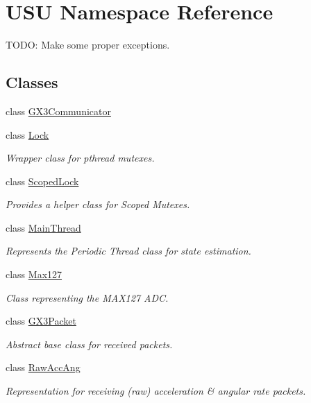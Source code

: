 \hypertarget{namespace_u_s_u}{\section{\-U\-S\-U \-Namespace \-Reference}
\label{namespace_u_s_u}
}


\-T\-O\-D\-O\-: \-Make some proper exceptions.  


\subsection*{\-Classes}
\begin{DoxyCompactItemize}
\item 
class \hyperlink{class_u_s_u_1_1_g_x3_communicator}{\-G\-X3\-Communicator}
\item 
class \hyperlink{class_u_s_u_1_1_lock}{\-Lock}
\begin{DoxyCompactList}\small\item\em \-Wrapper class for pthread mutexes. \end{DoxyCompactList}\item 
class \hyperlink{class_u_s_u_1_1_scoped_lock}{\-Scoped\-Lock}
\begin{DoxyCompactList}\small\item\em \-Provides a helper class for \-Scoped \-Mutexes. \end{DoxyCompactList}\item 
class \hyperlink{class_u_s_u_1_1_main_thread}{\-Main\-Thread}
\begin{DoxyCompactList}\small\item\em \-Represents the \-Periodic \-Thread class for state estimation. \end{DoxyCompactList}\item 
class \hyperlink{class_u_s_u_1_1_max127}{\-Max127}
\begin{DoxyCompactList}\small\item\em \-Class representing the \-M\-A\-X127 \-A\-D\-C. \end{DoxyCompactList}\item 
class \hyperlink{class_u_s_u_1_1_g_x3_packet}{\-G\-X3\-Packet}
\begin{DoxyCompactList}\small\item\em \-Abstract base class for received packets. \end{DoxyCompactList}\item 
class \hyperlink{class_u_s_u_1_1_raw_acc_ang}{\-Raw\-Acc\-Ang}
\begin{DoxyCompactList}\small\item\em \-Representation for receiving (raw) acceleration \& angular rate packets. \end{DoxyCompactList}\item 

\end{DoxyCompactItemize}
